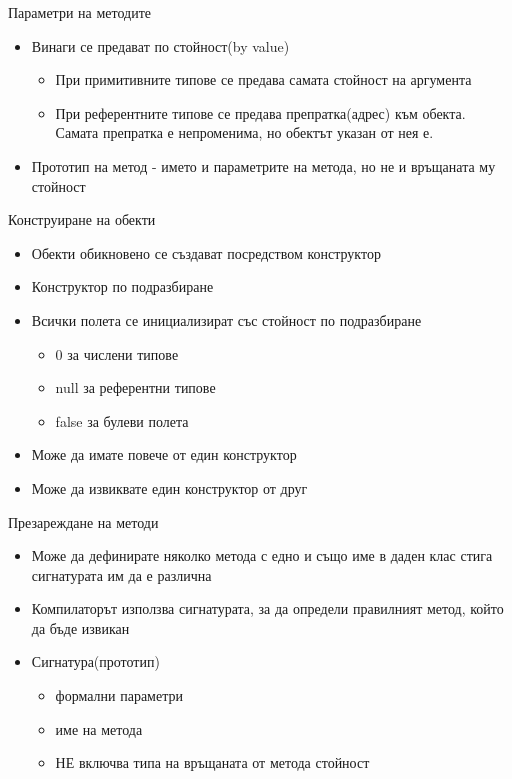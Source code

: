 \documentclass{beamer}
\begin{document}
\begin{frame}{Параметри на методите}
  \transdissolve
  \begin{itemize}
  \item Винаги се предават по стойност(by value)
    \begin{itemize}
      \item При примитивните типове се предава самата стойност на
        аргумента
      \item При референтните типове се предава препратка(адрес) към
        обекта. Самата препратка е непроменима, но обектът указан от
        нея е.
    \end{itemize}
  \item Прототип на метод - името и параметрите на метода, но не и
    връщаната му стойност
  \end{itemize}
\end{frame}
\begin{frame}{Конструиране на обекти}
  \transdissolve
  \begin{itemize}
  \item Обекти обикновено се създават посредством конструктор
  \item Конструктор по подразбиране
  \item Всички полета се инициализират със стойност по подразбиране
    \begin{itemize}
      \item 0 за числени типове
      \item null за референтни типове
      \item false за булеви полета
    \end{itemize}
  \item Може да имате повече от един конструктор
  \item Може да извиквате един конструктор от друг
  \end{itemize}
\end{frame}

\begin{frame}{Презареждане на методи}
  \transdissolve
  \begin{itemize}
  \item Може да дефинирате няколко метода с едно и също име в даден
    клас стига сигнатурата им да е различна
  \item Компилаторът използва сигнатурата, за да определи правилният
    метод, който да бъде извикан
  \item Сигнатура(прототип)
    \begin{itemize}
      \item формални параметри
      \item име на метода
      \item НЕ включва типа на връщаната от метода стойност
    \end{itemize}
  \end{itemize}
\end{frame}
\end{document}
